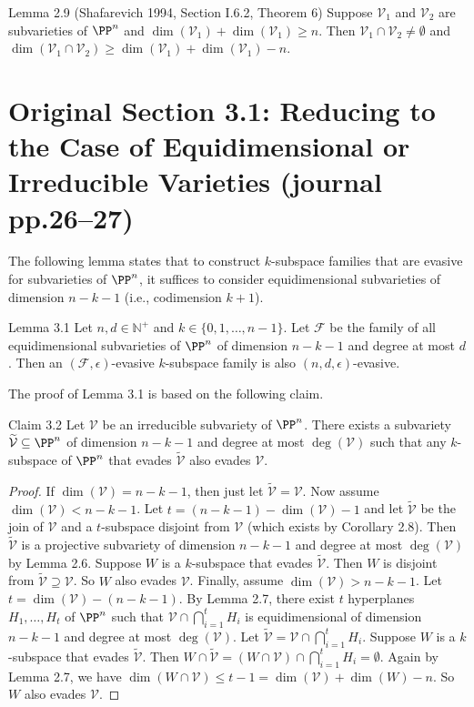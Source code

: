 \begin{result}{Lemma 2.9 (Shafarevich 1994, Section I.6.2, Theorem 6)}
Suppose $\mathcal V_1$ and $\mathcal V_2$ are subvarieties of $\PP^n$ and $\dim(\mathcal V_1)+\dim(\mathcal V_1)\ge n$. Then $\mathcal V_1\cap\mathcal V_2\ne\emptyset$ and $\dim(\mathcal V_1\cap\mathcal V_2)\ge\dim(\mathcal V_1)+\dim(\mathcal V_1)-n$.
\end{result}
\section*{Original Section 3.1: Reducing to the Case of Equidimensional or Irreducible Varieties (journal pp.26--27)}
The following lemma states that to construct $k$-subspace families that are evasive for subvarieties of $\PP^n$, it suffices to consider equidimensional subvarieties of dimension $n-k-1$ (i.e., codimension $k+1$).
\begin{result}{Lemma 3.1}
Let $n,d\in\mathbb N^+$ and $k\in\{0,1,\ldots,n-1\}$. Let $\mathcal F$ be the family of all equidimensional subvarieties of $\PP^n$ of dimension $n-k-1$ and degree at most $d$. Then an $(\mathcal F,\epsilon)$-evasive $k$-subspace family is also $(n,d,\epsilon)$-evasive.
\end{result}
The proof of Lemma 3.1 is based on the following claim.
\begin{result}{Claim 3.2}
Let $\mathcal V$ be an irreducible subvariety of $\PP^n$. There exists a subvariety $\widetilde{\mathcal V}\subseteq\PP^n$ of dimension $n-k-1$ and degree at most $\deg(\mathcal V)$ such that any $k$-subspace of $\PP^n$ that evades $\widetilde{\mathcal V}$ also evades $\mathcal V$.
\end{result}
\begin{proof}
If $\dim(\mathcal V)=n-k-1$, then just let $\widetilde{\mathcal V}=\mathcal V$.
Now assume $\dim(\mathcal V)<n-k-1$. Let $t=(n-k-1)-\dim(\mathcal V)-1$ and let $\widetilde{\mathcal V}$ be the join of $\mathcal V$ and a $t$-subspace disjoint from $\mathcal V$ (which exists by Corollary 2.8). Then $\widetilde{\mathcal V}$ is a projective subvariety of dimension $n-k-1$ and degree at most $\deg(\mathcal V)$ by Lemma 2.6. Suppose $W$ is a $k$-subspace that evades $\widetilde{\mathcal V}$. Then $W$ is disjoint from $\widetilde{\mathcal V}\supseteq\mathcal V$. So $W$ also evades $\mathcal V$.
Finally, assume $\dim(\mathcal V)>n-k-1$. Let $t=\dim(\mathcal V)-(n-k-1)$. By Lemma 2.7, there exist $t$ hyperplanes $H_1,\ldots,H_t$ of $\PP^n$ such that $\mathcal V\cap\bigcap_{i=1}^tH_i$ is equidimensional of dimension $n-k-1$ and degree at most $\deg(\mathcal V)$. Let $\widetilde{\mathcal V}=\mathcal V\cap\bigcap_{i=1}^tH_i$. Suppose $W$ is a $k$-subspace that evades $\widetilde{\mathcal V}$. Then $W\cap\widetilde{\mathcal V}=(W\cap\mathcal V)\cap\bigcap_{i=1}^tH_i=\emptyset$. Again by Lemma 2.7, we have $\dim(W\cap\mathcal V)\le t-1=\dim(\mathcal V)+\dim(W)-n$. So $W$ also evades $\mathcal V$.
\end{proof}
